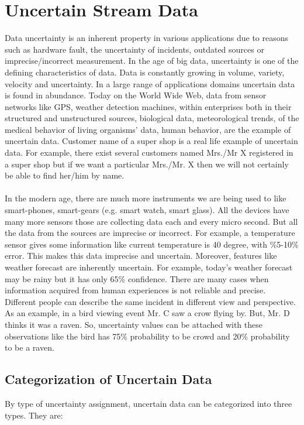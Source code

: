 \section{Uncertain Stream Data}
Data uncertainty is an inherent property in various applications due to reasons such as hardware fault, the uncertainty of incidents, outdated sources or imprecise/incorrect measurement. In the age of big data, uncertainty is one of the defining characteristics of data. Data is constantly growing in volume, variety, velocity and uncertainty. In a large range of applications domains uncertain data is found in abundance.  Today on the World Wide Web, data from sensor networks like GPS, weather detection machines, within enterprises both in their structured and unstructured sources, biological data, meteorological trends, of the medical behavior of living organisms’ data, human behavior, are the example of uncertain data. Customer name of a super shop is a real life example of uncertain data. For example, there exist several customers named Mrs./Mr X registered in a super shop but if we want a particular Mrs./Mr. X then we will not certainly be able to find her/him by name.\\ \\
In the modern age, there are much more instruments we are being used to like smart-phones, smart-gears (e.g. smart watch, smart glass). All the devices have many more sensors those are collecting data each and every micro second. But all the data from the sources are imprecise or incorrect. For example, a temperature sensor gives some information like current temperature is 40 degree, with \%5-10\% error. This makes this data imprecise and uncertain. Moreover, features like weather forecast are inherently uncertain. For example, today's weather forecast may be rainy but it has only 65\% confidence. There are many cases when information acquired from human experiences is not reliable and precise. Different people can describe the same incident in different view and perspective. As an example, in a bird viewing event Mr. C saw a crow flying by. But, Mr. D thinks it was a raven. So, uncertainty values can be attached with these observations like the bird has 75\% probability to be crowd and 20\% probability to be a raven.

\subsection{Categorization of Uncertain Data}
By type of uncertainty assignment, uncertain data can be categorized into three types. They are:
